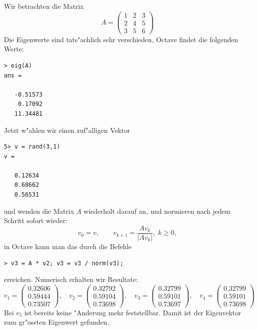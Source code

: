 \begin{beispiel}
Wir betrachten die Matrix 
\[
A=\begin{pmatrix}
1&2&3\\
2&4&5\\
3&5&6
\end{pmatrix}
\]
Die Eigenwerte sind tats"achlich sehr verschieden, Octave findet
die folgenden Werte:
\begin{verbatim}
> eig(A)
ans =

   -0.51573
    0.17092
   11.34481
\end{verbatim}
Jetzt w"ahlen wir einen zuf"alligen Vektor
\begin{verbatim}
5> v = rand(3,1)
v =

   0.12634
   0.68662
   0.56531
\end{verbatim}
und wenden die Matrix $A$ wiederholt darauf an, und normieren nach
jedem Schritt sofort wieder:
\[
v_0 = v,\qquad v_{k+1}=\frac{Av_k}{|Av_k|},\; k\ge 0,
\]
in Octave kann man das durch die Befehle
\begin{verbatim}
> v3 = A * v2; v3 = v3 / norm(v3);
\end{verbatim}
erreichen.
Numerisch erhalten wir Resultate:
\[
v_1=\begin{pmatrix}
   0.32606\\
   0.59444\\
   0.73507
\end{pmatrix}
,\quad
v_2=\begin{pmatrix}
   0.32792\\
   0.59104\\
   0.73698
\end{pmatrix}
,\quad
v_3=\begin{pmatrix}
   0.32799\\
   0.59101\\
   0.73697
\end{pmatrix}
,\quad
v_4=\begin{pmatrix}
   0.32799\\
   0.59101\\
   0.73698
\end{pmatrix}
\]
Bei $v_5$ ist bereits keine "Anderung mehr feststellbar.
Damit ist der Eigenvektor zum gr"ossten Eigenwert gefunden, 
\end{beispiel}

